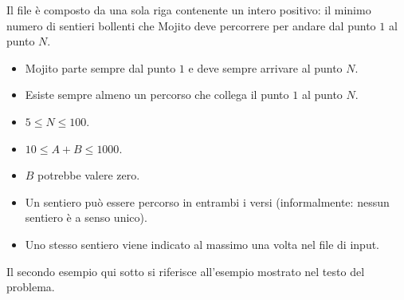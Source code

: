 \Output
Il file \outputfile{} è composto da una sola riga contenente un intero positivo: il minimo numero di sentieri bollenti che Mojito deve percorrere per andare dal punto $1$ al punto $N$.

\Constraints
\begin{itemize}[nolistsep, itemsep=2mm]
  \item Mojito parte sempre dal punto $1$ e deve sempre arrivare al punto $N$.
  \item Esiste sempre almeno un percorso che collega il punto $1$ al punto $N$.
  \item $ 5 \le N \le 100 $.
  \item $10 \le A+B \le 1000$.
  \item $B$ potrebbe valere zero.
  \item Un sentiero può essere percorso in entrambi i versi (informalmente: nessun sentiero è a senso unico).
  \item Uno stesso sentiero viene indicato al massimo una volta nel file di input.
\end{itemize}

\Examples
Il secondo esempio qui sotto si riferisce all'esempio mostrato nel testo del problema.

\begin{example}
%
%
\end{example}
